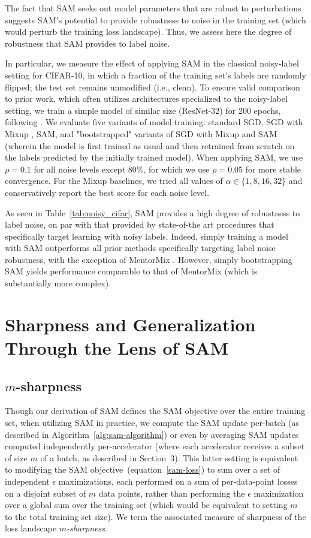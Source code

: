 \documentclass{article} %
\begin{document}
The fact that SAM seeks out model parameters that are robust to perturbations suggests SAM's potential to provide robustness to noise in the training set (which would perturb the training loss landscape).  Thus, we assess here the degree of robustness that SAM provides to label noise.

In particular, we measure the effect of applying SAM in the classical noisy-label setting for CIFAR-10, in which a fraction of the training set's labels are randomly flipped; the test set remains unmodified (i.e., clean).  To ensure valid comparison to prior work, which often utilizes architectures specialized to the noisy-label setting, we train a simple model of similar size (ResNet-32) for 200 epochs, following \cite{2019arXiv191109781J}.  We evaluate five variants of model training: standard SGD, SGD with Mixup \citep{zhang2017mixup}, SAM, and "bootstrapped" variants of SGD with Mixup and SAM (wherein the model is first trained as usual and then retrained from scratch on the labels predicted by the initially trained model). When applying SAM, we use $\rho=0.1$ for all noise levels except 80\%, for which we use $\rho=0.05$ for more stable convergence. For the Mixup baselines, we tried all values of $\alpha \in \{1, 8, 16, 32\}$ and conservatively report the best score for each noise level.

As seen in Table~\ref{tab:noisy_cifar}, SAM provides a high degree of robustness to label noise, on par with that provided by state-of-the art procedures that specifically target learning with noisy labels.  Indeed, simply training a model with SAM outperforms all prior methods specifically targeting label noise robustness, with the exception of MentorMix \citep{2019arXiv191109781J}.  However, simply bootstrapping SAM yields performance comparable to that of MentorMix (which is substantially more complex).

\section{Sharpness and Generalization Through the Lens of SAM}

\subsection{$m$-sharpness}

Though our derivation of SAM defines the SAM objective over the entire training set, when utilizing SAM in practice, we compute the SAM update per-batch (as described in Algorithm~\ref{alg:sam-algorithm}) or even by averaging SAM updates computed independently per-accelerator (where each accelerator receives a subset of size $m$ of a batch, as described in Section~3).  This latter setting is equivalent to modifying the SAM objective~(equation~\ref{sam-loss}) to sum over a set of independent $\epsilon$ maximizations, each performed on a sum of per-data-point losses on a disjoint subset of $m$ data points, rather than performing the $\epsilon$ maximization over a global sum over the training set (which would be equivalent to setting $m$ to the total training set size).  We term the associated measure of sharpness of the loss landscape \textit{$m$-sharpness}.
\end{document}
